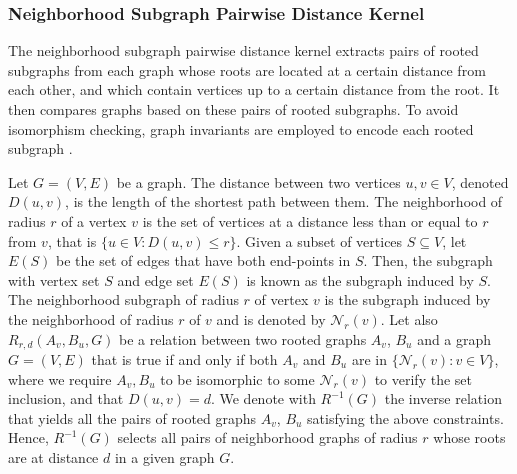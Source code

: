 \documentclass[twoside,11pt]{article}
\begin{document}
\subsubsection{Neighborhood Subgraph Pairwise Distance Kernel}
The neighborhood subgraph pairwise distance kernel extracts pairs of rooted subgraphs from each graph whose roots are located at a certain distance from each other, and which contain vertices up to a certain distance from the root.
It then compares graphs based on these pairs of rooted subgraphs.
To avoid isomorphism checking, graph invariants are employed to encode each rooted subgraph .

Let $G=(V,E)$ be a graph.
The distance between two vertices $u,v \in V$, denoted $D(u,v)$, is the length of the shortest path between them.
The neighborhood of radius $r$ of a vertex $v$ is the set of vertices at a distance less than or equal to $r$ from $v$, that is $\{ u \in V : D(u,v) \leq r\}$.
Given a subset of vertices $S \subseteq V$, let $E(S)$ be the set of edges that have both end-points in $S$.
Then, the subgraph with vertex set $S$ and edge set $E(S)$ is known as the subgraph induced by $S$.
The neighborhood subgraph of radius $r$ of vertex $v$ is the subgraph induced by the neighborhood of radius $r$ of $v$ and is denoted by $\mathcal{N}_r(v)$.
Let also $R_{r,d}(A_v,B_u,G)$ be a relation between two rooted graphs $A_v$, $B_u$ and a graph $G=(V,E)$ that is true if and only if both $A_v$ and $B_u$ are in $\{\mathcal{N}_r(v) : v \in V \}$, where we require $A_v, B_u$ to be isomorphic to some $\mathcal{N}_r(v)$ to verify the set inclusion, and that $D(u,v) = d$.
We denote with $R^{-1}(G)$ the inverse relation that yields all the pairs of rooted graphs $A_v$, $B_u$ satisfying the above constraints.
Hence, $R^{-1}(G)$ selects all pairs of neighborhood graphs of radius $r$ whose roots are at distance $d$ in a given graph $G$.
\end{document}
